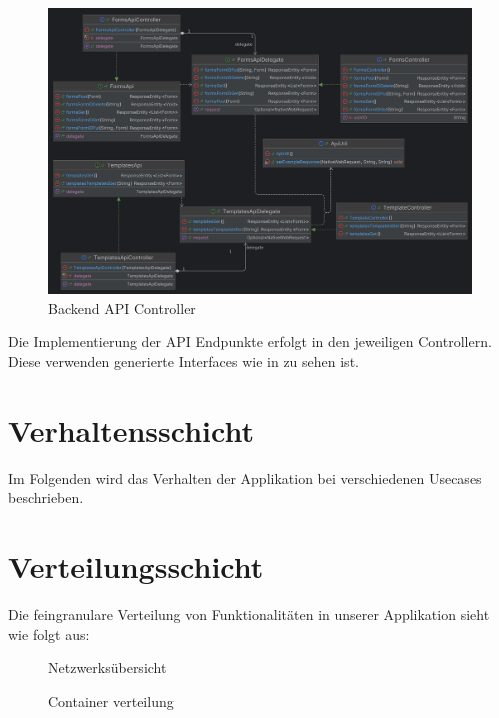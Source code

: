 \begin{figure}[H]
    \centering
    \includegraphics[width=15cm]{images/classDiagrams/Api}
    \caption{Backend API Controller}\label{fig:Backend-API-Controller}
\end{figure}

Die Implementierung der \ac{API} Endpunkte erfolgt in den jeweiligen Controllern.
Diese verwenden generierte Interfaces wie in  zu sehen ist.


\section{Verhaltensschicht}\label{sec:verhaltensschicht}
Im Folgenden wird das Verhalten der Applikation bei verschiedenen Usecases beschrieben.

\section{Verteilungsschicht}\label{sec:verteilungsschicht}
Die feingranulare Verteilung von Funktionalitäten in unserer Applikation sieht wie folgt aus:


\begin{figure}[h]
    \centering
    
    \caption{Netzwerksübersicht}\label{fig:Netzwerksuebersicht}
\end{figure}


\begin{figure}[h]
    \centering
    
    \caption{Container verteilung}\label{fig:Container-verteilung}
\end{figure}